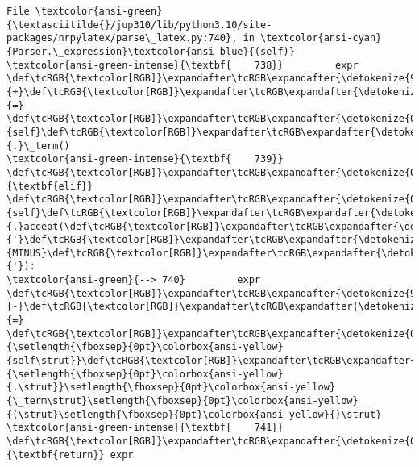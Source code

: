 \documentclass[landscape,letterpaper,10pt,english]{article}
\begin{document}
\begin{Verbatim}[commandchars=\\\{\}, frame=single, framerule=2mm, rulecolor=\color{outerrorbackground}]
File \textcolor{ansi-green}{\textasciitilde{}/jup310/lib/python3.10/site-packages/nrpylatex/parse\_latex.py:740}, in \textcolor{ansi-cyan}{Parser.\_expression}\textcolor{ansi-blue}{(self)}
\textcolor{ansi-green-intense}{\textbf{    738}}         expr \def\tcRGB{\textcolor[RGB]}\expandafter\tcRGB\expandafter{\detokenize{98,98,98}}{+}\def\tcRGB{\textcolor[RGB]}\expandafter\tcRGB\expandafter{\detokenize{98,98,98}}{=} \def\tcRGB{\textcolor[RGB]}\expandafter\tcRGB\expandafter{\detokenize{0,135,0}}{self}\def\tcRGB{\textcolor[RGB]}\expandafter\tcRGB\expandafter{\detokenize{98,98,98}}{.}\_term()
\textcolor{ansi-green-intense}{\textbf{    739}}     \def\tcRGB{\textcolor[RGB]}\expandafter\tcRGB\expandafter{\detokenize{0,135,0}}{\textbf{elif}} \def\tcRGB{\textcolor[RGB]}\expandafter\tcRGB\expandafter{\detokenize{0,135,0}}{self}\def\tcRGB{\textcolor[RGB]}\expandafter\tcRGB\expandafter{\detokenize{98,98,98}}{.}accept(\def\tcRGB{\textcolor[RGB]}\expandafter\tcRGB\expandafter{\detokenize{175,0,0}}{'}\def\tcRGB{\textcolor[RGB]}\expandafter\tcRGB\expandafter{\detokenize{175,0,0}}{MINUS}\def\tcRGB{\textcolor[RGB]}\expandafter\tcRGB\expandafter{\detokenize{175,0,0}}{'}):
\textcolor{ansi-green}{--> 740}         expr \def\tcRGB{\textcolor[RGB]}\expandafter\tcRGB\expandafter{\detokenize{98,98,98}}{-}\def\tcRGB{\textcolor[RGB]}\expandafter\tcRGB\expandafter{\detokenize{98,98,98}}{=} \def\tcRGB{\textcolor[RGB]}\expandafter\tcRGB\expandafter{\detokenize{0,135,0}}{\setlength{\fboxsep}{0pt}\colorbox{ansi-yellow}{self\strut}}\def\tcRGB{\textcolor[RGB]}\expandafter\tcRGB\expandafter{\detokenize{98,98,98}}{\setlength{\fboxsep}{0pt}\colorbox{ansi-yellow}{.\strut}}\setlength{\fboxsep}{0pt}\colorbox{ansi-yellow}{\_term\strut}\setlength{\fboxsep}{0pt}\colorbox{ansi-yellow}{(\strut}\setlength{\fboxsep}{0pt}\colorbox{ansi-yellow}{)\strut}
\textcolor{ansi-green-intense}{\textbf{    741}} \def\tcRGB{\textcolor[RGB]}\expandafter\tcRGB\expandafter{\detokenize{0,135,0}}{\textbf{return}} expr


\end{Verbatim}
\end{document}
